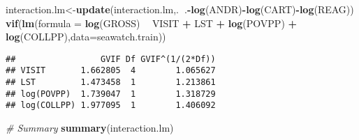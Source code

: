 \documentclass[]{article}
\newenvironment{Shaded}{\begin{snugshade}}{\end{snugshade}}
\newcommand{\KeywordTok}[1]{\textcolor[rgb]{0.13,0.29,0.53}{\textbf{#1}}}
\newcommand{\DataTypeTok}[1]{\textcolor[rgb]{0.13,0.29,0.53}{#1}}
\newcommand{\StringTok}[1]{\textcolor[rgb]{0.31,0.60,0.02}{#1}}
\newcommand{\CommentTok}[1]{\textcolor[rgb]{0.56,0.35,0.01}{\textit{#1}}}
\newcommand{\OperatorTok}[1]{\textcolor[rgb]{0.81,0.36,0.00}{\textbf{#1}}}
\newcommand{\NormalTok}[1]{#1}
\begin{document}
\begin{Shaded}
\begin{Highlighting}[]
\NormalTok{interaction.lm<-}\KeywordTok{update}\NormalTok{(interaction.lm,.}\OperatorTok{~}\NormalTok{.}\OperatorTok{-}\KeywordTok{log}\NormalTok{(ANDR)}\OperatorTok{-}\KeywordTok{log}\NormalTok{(CART)}\OperatorTok{-}\KeywordTok{log}\NormalTok{(REAG))}
\KeywordTok{vif}\NormalTok{(}\KeywordTok{lm}\NormalTok{(}\DataTypeTok{formula =} \KeywordTok{log}\NormalTok{(GROSS) }\OperatorTok{~}\StringTok{ }\NormalTok{VISIT }\OperatorTok{+}\StringTok{ }\NormalTok{LST }\OperatorTok{+}\StringTok{ }\KeywordTok{log}\NormalTok{(POVPP) }\OperatorTok{+}\StringTok{ }\KeywordTok{log}\NormalTok{(COLLPP),}\DataTypeTok{data=}\NormalTok{seawatch.train))}
\end{Highlighting}
\end{Shaded}

\begin{verbatim}
##                 GVIF Df GVIF^(1/(2*Df))
## VISIT       1.662805  4        1.065627
## LST         1.473458  1        1.213861
## log(POVPP)  1.739047  1        1.318729
## log(COLLPP) 1.977095  1        1.406092
\end{verbatim}

\begin{Shaded}
\begin{Highlighting}[]
\CommentTok{# Summary}
\KeywordTok{summary}\NormalTok{(interaction.lm)}
\end{Highlighting}
\end{Shaded}
\end{document}
